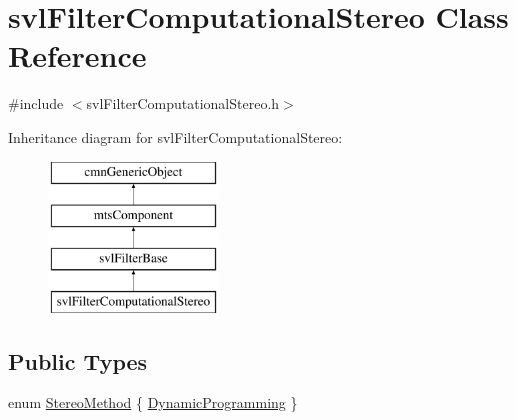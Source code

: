 \hypertarget{classsvl_filter_computational_stereo}{\section{svl\-Filter\-Computational\-Stereo Class Reference}
\label{classsvl_filter_computational_stereo}
}


{\ttfamily \#include $<$svl\-Filter\-Computational\-Stereo.\-h$>$}

Inheritance diagram for svl\-Filter\-Computational\-Stereo\-:\begin{figure}[H]
\begin{center}
\leavevmode
\includegraphics[height=4.000000cm]{d8/d92/classsvl_filter_computational_stereo}
\end{center}
\end{figure}
\subsection*{Public Types}
\begin{DoxyCompactItemize}
\item 
enum \hyperlink{classsvl_filter_computational_stereo_aa424620e36780b986f928099b25f0e91}{Stereo\-Method} \{ \hyperlink{classsvl_filter_computational_stereo_aa424620e36780b986f928099b25f0e91a32b3649abc4439568d16df5fb44579df}{Dynamic\-Programming}
 \}
\end{DoxyCompactItemize}
